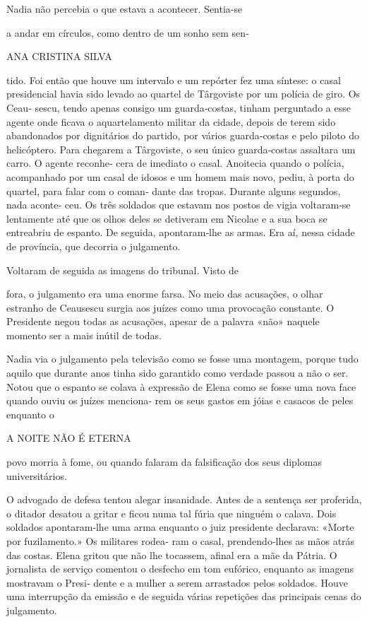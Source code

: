 Nadia não percebia o que estava a acontecer. Sentia‑se

a andar em círculos, como dentro de um sonho sem sen‑

ANA CRISTINA SILVA

tido. Foi então que houve um intervalo e um repórter fez uma síntese: o
casal presidencial havia sido levado ao quartel de Târgoviste por um
polícia de giro. Os Ceau‑ sescu, tendo apenas consigo um guarda‑costas,
tinham perguntado a esse agente onde ficava o aquartelamento militar da
cidade, depois de terem sido abandonados por dignitários do partido, por
vários guarda‑costas e pelo piloto do helicóptero. Para chegarem a
Târgoviste, o seu único guarda‑costas assaltara um carro. O agente
reconhe‑ cera de imediato o casal. Anoitecia quando o polícia,
acompanhado por um casal de idosos e um homem mais novo, pediu, à porta
do quartel, para falar com o coman‑ dante das tropas. Durante alguns
segundos, nada aconte‑ ceu. Os três soldados que estavam nos postos de
vigia voltaram‑se lentamente até que os olhos deles se detiveram em
Nicolae e a sua boca se entreabriu de espanto. De seguida, apontaram‑lhe
as armas. Era aí, nessa cidade de província, que decorria o julgamento.

Voltaram de seguida as imagens do tribunal. Visto de

fora, o julgamento era uma enorme farsa. No meio das acusações, o olhar
estranho de Ceausescu surgia aos juízes como uma provocação constante. O
Presidente negou todas as acusações, apesar de a palavra «não» naquele
momento ser a mais inútil de todas.

Nadia via o julgamento pela televisão como se fosse uma montagem, porque
tudo aquilo que durante anos tinha sido garantido como verdade passou a
não o ser. Notou que o espanto se colava à expressão de Elena como se
fosse uma nova face quando ouviu os juízes menciona‑ rem os seus gastos
em jóias e casacos de peles enquanto o

A NOITE NÃO É ETERNA

povo morria à fome, ou quando falaram da falsificação dos seus diplomas
universitários.

O advogado de defesa tentou alegar insanidade. Antes de a sentença ser
proferida, o ditador desatou a gritar e ficou numa tal fúria que ninguém
o calava. Dois soldados apontaram‑lhe uma arma enquanto o juiz
presidente declarava: «Morte por fuzilamento.» Os militares rodea‑ ram o
casal, prendendo‑lhes as mãos atrás das costas. Elena gritou que não lhe
tocassem, afinal era a mãe da Pátria. O jornalista de serviço comentou o
desfecho em tom eufórico, enquanto as imagens mostravam o Presi‑ dente e
a mulher a serem arrastados pelos soldados. Houve uma interrupção da
emissão e de seguida várias repetições das principais cenas do
julgamento.

